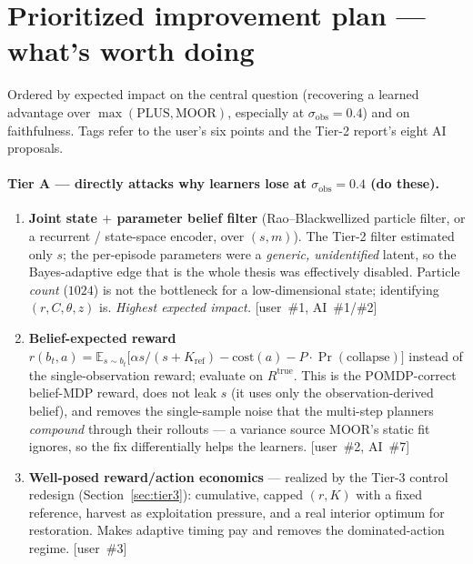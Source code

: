 \documentclass[11pt]{article}
\newcommand{\Kref}{K_{\mathrm{ref}}}
\newcommand{\sobs}{\sigma_{\mathrm{obs}}}
\newcommand{\Rtrue}{R^{\mathrm{true}}}
\begin{document}
\section{Prioritized improvement plan --- what's worth doing}
\label{sec:plan}
Ordered by expected impact on the central question (recovering a learned advantage
over $\max(\text{PLUS},\text{MOOR})$, especially at $\sobs{=}0.4$) and on
faithfulness. Tags refer to the user's six points and the Tier-2 report's eight AI
proposals.

\paragraph{Tier A --- directly attacks why learners lose at $\sobs{=}0.4$ (do these).}
\begin{enumerate}[leftmargin=1.8em,nosep]
\item \textbf{Joint state $+$ parameter belief filter} (Rao--Blackwellized particle
filter, or a recurrent / state-space encoder, over $(s,m)$). The Tier-2 filter
estimated only $s$; the per-episode parameters were a \emph{generic, unidentified}
latent, so the Bayes-adaptive edge that is the whole thesis was effectively
disabled. Particle \emph{count} ($1024$) is not the bottleneck for a low-dimensional
state; identifying $(r,C,\theta,z)$ is. \emph{Highest expected impact.} [user~\#1,
AI~\#1/\#2]
\item \textbf{Belief-expected reward} $r(b_t,a)=\mathbb{E}_{s\sim b_t}\!\big[\alpha
s/(s+\Kref)-\mathrm{cost}(a)-P\cdot\Pr(\text{collapse})\big]$ instead of the
single-observation reward; evaluate on $\Rtrue$. This is the POMDP-correct
belief-MDP reward, does not leak $s$ (it uses only the observation-derived belief),
and removes the single-sample noise that the multi-step planners \emph{compound}
through their rollouts --- a variance source MOOR's static fit ignores, so the fix
differentially helps the learners. [user~\#2, AI~\#7]
\item \textbf{Well-posed reward/action economics} --- realized by the Tier-3
control redesign (Section~\ref{sec:tier3}): cumulative, capped $(r,K)$ with a fixed
reference, harvest as exploitation pressure, and a real interior optimum for
restoration. Makes adaptive timing pay and removes the dominated-action regime.
[user~\#3]
\end{enumerate}
\end{document}

